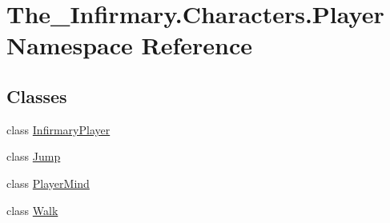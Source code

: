 \hypertarget{namespace_the___infirmary_1_1_characters_1_1_player}{}\section{The\+\_\+\+Infirmary.\+Characters.\+Player Namespace Reference}
\label{namespace_the___infirmary_1_1_characters_1_1_player}
\subsection*{Classes}
\begin{DoxyCompactItemize}
\item 
class \mbox{\hyperlink{class_the___infirmary_1_1_characters_1_1_player_1_1_infirmary_player}{Infirmary\+Player}}
\item 
class \mbox{\hyperlink{class_the___infirmary_1_1_characters_1_1_player_1_1_jump}{Jump}}
\item 
class \mbox{\hyperlink{class_the___infirmary_1_1_characters_1_1_player_1_1_player_mind}{Player\+Mind}}
\item 
class \mbox{\hyperlink{class_the___infirmary_1_1_characters_1_1_player_1_1_walk}{Walk}}
\end{DoxyCompactItemize}
